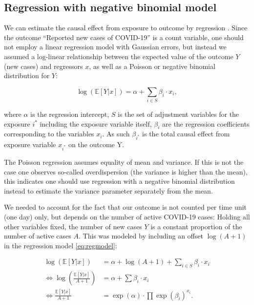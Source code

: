 \documentclass[]{elsarticle} %
\begin{document}
\subsection{Regression with negative binomial
model}\label{regression-with-negative-binomial-model}

We can estimate the causal effect from exposure to outcome by regression
\citep{pearl2009causality}. Since the outcome ``Reported new cases of
COVID-19'' is a count variable, one should not employ a linear
regression model with Gaussian errors, but instead we assumed a
log-linear relationship between the expected value of the outcome \(Y\)
(new cases) and regressors \(x\), as well as a Poisson or negative
binomial distribution for \(Y\):

\begin{equation}
\log(\mathbb{E}[Y|x]) = \alpha + \sum_{i\in S}\beta_i\cdot x_{i}, \label{eq:regmodel}
\end{equation}

where \(\alpha\) is the regression intercept, \(S\) is the set of
adjustment variables for the exposure \(i^{\ast}\) including the
exposure variable itself, \(\beta_i\) are the regression coefficients
corresponding to the variables \(x_i\). As such \(\beta_{i^{\ast}}\) is
the total causal effect from exposure variable \(x_{i^{\ast}}\) on the
outcome Y.

The Poisson regression assumes equality of mean and variance. If this is
not the case one observes so-called overdispersion (the variance is
higher than the mean), this indicates one should use regression with a
negative binomial distribution instead to estimate the variance
parameter separately from the mean.

We needed to account for the fact that our outcome is not counted per
time unit (one day) only, but depends on the number of active COVID-19
cases: Holding all other variables fixed, the number of new cases \(Y\)
is a constant proportion of the number of active cases \(A\). This was
modeled by including an offset \(\log(A+1)\) in the regression model
\eqref{eq:regmodel}:

\begin{align}
\log(\mathbb{E}[Y|x]) &= \alpha + \log(A+1) + \sum_{i\in S}\beta_i\cdot x_{i} \nonumber \\
\Leftrightarrow \log(\frac{\mathbb{E}[Y|x]}{A+1}) &= \alpha + \sum\beta_i\cdot x_{i} \label{eq:logratemodel} \\
\Leftrightarrow \frac{\mathbb{E}[Y|x]}{A+1} &= \exp(\alpha)\cdot \prod \exp(\beta_i)^{x_i}. \label{eq:ratechange}
\end{align}
\end{document}
